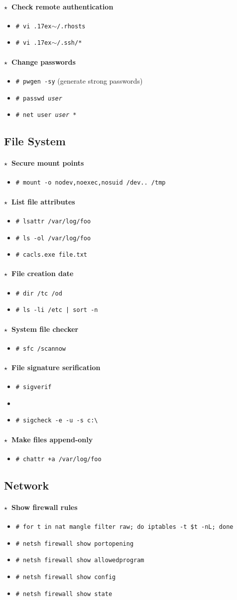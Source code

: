 \documentclass[10pt,landscape]{article}
\newcommand{\os}[1]{\texttt{\footnotesize{#1}}}
\newcommand{\bsd}{\os{B}}
\newcommand{\unix}{\os{U}}
\newcommand{\linux}{\os{L}}
\newcommand{\windows}{\os{W}}
\newenvironment{action}[1]
  {\paragraph{$\star$~#1}\begin{itemize}[leftmargin=1cm]}
  {\end{itemize}}
\newcommand{\cmd}[2]{\item[#1] {\small\tt\# #2}}
\newcommand{\comment}[1]{\textrm{\small(#1)}}
\newcommand{\tool}[2]{\item[#1] {\footnotesize\sc{#2}}\xspace}
\newcommand{\home}{\raise.17ex\hbox{$\scriptstyle\sim$}}
\begin{document}
\begin{multicols*}{3}
\begin{action}{Check remote authentication}
\cmd{\unix}{vi \home/.rhosts}
\cmd{\unix}{vi \home/.ssh/*}
\end{action}

\begin{action}{Change passwords}
\cmd{\unix}{pwgen -sy} \comment{generate strong passwords}
\cmd{\unix}{passwd \emph{user}}
\cmd{\windows}{net user \emph{user} *}
\end{action}

\subsection*{File System}

\begin{action}{Secure mount points}
\cmd{\unix}{mount -o nodev,noexec,nosuid /dev.. /tmp}
\end{action}

\begin{action}{List file attributes}
\cmd{\linux}{lsattr /var/log/foo}
\cmd{\bsd}{ls -ol /var/log/foo}
\cmd{\windows}{cacls.exe file.txt}
\end{action}

\begin{action}{File creation date}
\cmd{\windows}{dir /tc /od}
\cmd{\unix}{ls -li /etc | sort -n}
\end{action}

\begin{action}{System file checker }
\cmd{\windows}{sfc /scannow}
\end{action}

\begin{action}{File signature serification}
\cmd{\windows}{sigverif}
\tool{\windows}{sigcheck}
\cmd{\windows}{sigcheck -e -u -s c:{\textbackslash} }
\end{action}

\begin{action}{Make files append-only}
\cmd{\linux}{chattr +a /var/log/foo}
\end{action}

\subsection*{Network}

\begin{action}{Show firewall rules}
\cmd{\linux}{for t in nat mangle filter raw; do iptables -t \$t -nL; done}
\cmd{\windows}{netsh firewall show portopening}
\cmd{\windows}{netsh firewall show allowedprogram}
\cmd{\windows}{netsh firewall show config}
\cmd{\windows}{netsh firewall show state}
\end{action}


\end{multicols*}
\end{document}
